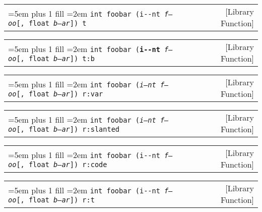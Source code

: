 \documentclass{book}
\newcommand\GNUTexinfocommandstyletextvar[1]{{\normalfont{}\textsl{#1}}}%
\begin{document}
%

\noindent\begin{tabularx}{\linewidth}{@{}Xr}
\rightskip=5em plus 1 fill
\hangindent=2em
\texttt{int foobar (\texttt{i{-}{-}nt}\ \GNUTexinfocommandstyletextvar{f---oo}[,\ float\ \GNUTexinfocommandstyletextvar{b--ar}])\ t}& [Library Function]
\end{tabularx}

%

\noindent\begin{tabularx}{\linewidth}{@{}Xr}
\rightskip=5em plus 1 fill
\hangindent=2em
\texttt{int foobar (\texttt{\textbf{i{-}{-}nt}}\ \GNUTexinfocommandstyletextvar{f---oo}[,\ float\ \GNUTexinfocommandstyletextvar{b--ar}])\ t:b}& [Library Function]
\end{tabularx}

%

\noindent\begin{tabularx}{\linewidth}{@{}Xr}
\rightskip=5em plus 1 fill
\hangindent=2em
\texttt{int foobar (\textnormal{\GNUTexinfocommandstyletextvar{i--nt}}\ \GNUTexinfocommandstyletextvar{f---oo}[,\ float\ \GNUTexinfocommandstyletextvar{b--ar}])\ r:var}& [Library Function]
\end{tabularx}

%

\noindent\begin{tabularx}{\linewidth}{@{}Xr}
\rightskip=5em plus 1 fill
\hangindent=2em
\texttt{int foobar (\textnormal{\textsl{i--nt}}\ \GNUTexinfocommandstyletextvar{f---oo}[,\ float\ \GNUTexinfocommandstyletextvar{b--ar}])\ r:slanted}& [Library Function]
\end{tabularx}

%

\noindent\begin{tabularx}{\linewidth}{@{}Xr}
\rightskip=5em plus 1 fill
\hangindent=2em
\texttt{int foobar (\textnormal{\texttt{i{-}{-}nt}}\ \GNUTexinfocommandstyletextvar{f---oo}[,\ float\ \GNUTexinfocommandstyletextvar{b--ar}])\ r:code}& [Library Function]
\end{tabularx}

%

\noindent\begin{tabularx}{\linewidth}{@{}Xr}
\rightskip=5em plus 1 fill
\hangindent=2em
\texttt{int foobar (\textnormal{\texttt{i{-}{-}nt}}\ \GNUTexinfocommandstyletextvar{f---oo}[,\ float\ \GNUTexinfocommandstyletextvar{b--ar}])\ r:t}& [Library Function]
\end{tabularx}
\end{document}
